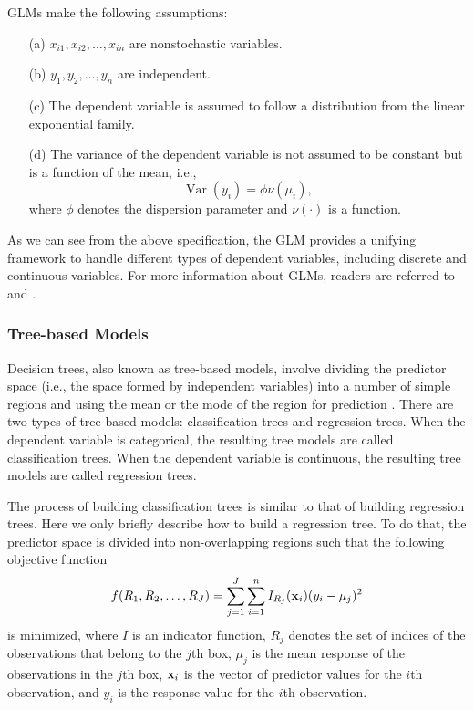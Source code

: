 \documentclass[12pt]{article}
\newcommand{\var}{\operatorname{Var}}
\newcommand{\bfx}[1]{{\bf #1}}
\begin{document}
GLMs make the following assumptions:
\begin{enumerate}
\item[(a)] $x_{i1},x_{i2},\ldots,x_{in}$ are nonstochastic variables.
\item[(b)] $y_1,y_2,\ldots,y_n$ are independent.
\item[(c)] The dependent variable is assumed to follow a distribution from the linear exponential family. 
\item[(d)] The variance of the dependent variable is not assumed to be constant but is a function of the mean, i.e.,
\begin{equation}\label{eq:glm-varyi}
\var{(y_i)} = \phi \nu(\mu_i),
\end{equation}
where $\phi$ denotes the dispersion parameter and $\nu(\cdot)$ is a function. 
\end{enumerate}

As we can see from the above specification, the GLM provides a unifying framework to handle different types of dependent variables, including discrete and continuous variables. For more information about GLMs, readers are referred to \citep{dejong2008} and \citep{frees2009}. 

\subsubsection{Tree-based Models}

Decision trees, also known as tree-based models, involve dividing the predictor space (i.e., the space formed by independent variables) into a number of simple regions and using the mean or the mode of the region for prediction \citep{breiman1984}. There are two types of tree-based models: classification trees and regression trees. When the dependent variable is categorical, the resulting tree models are called classification trees. When the dependent variable is continuous, the resulting tree models are called regression trees.

The process of building classification trees is similar to that of building regression trees. Here we only briefly describe how to build a regression tree. To do that, the predictor space is divided into non-overlapping regions such that the following objective function 
\begin{equation}\label{eq:tree-obj}
f(R_1,R_2,\ldots,R_J) = \sum_{j=1}^J \sum_{i=1}^n I_{R_j}(\bfx{x}_i)(y_i - \mu_j)^2
\end{equation} 
is minimized, where $I$ is an indicator function, $R_j$ denotes the set of indices of the observations that belong to the $j$th box, $\mu_j$ is the mean response of the observations in the $j$th box, $\bfx{x}_i$ is the vector of predictor values for the $i$th observation, and $y_i$ is the response value for the $i$th observation. 
\end{document}
